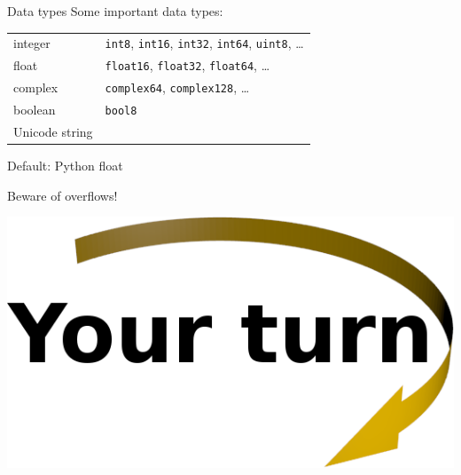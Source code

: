 \documentclass[svgnames]{beamer}
\begin{document}
\begin{frame}{Data types}
Some important data types:

\vspace{0.3truecm}
\begin{tabular}{ll}
integer & \texttt{int8}, \texttt{int16}, \texttt{int32}, \texttt{int64}, \texttt{uint8}, \dots\\[0.2truecm]
float   & \texttt{float16}, \texttt{float32}, \texttt{float64}, \dots \\[0.2truecm]
complex & \texttt{complex64}, \texttt{complex128}, \dots\\[0.2truecm]
boolean & \texttt{bool8}\\[0.2truecm]
Unicode string  & \\
\end{tabular}

\vspace{0.3truecm}
Default: Python float

\vspace{0.3truecm}
\begin{center}
 \alert{Beware of overflows!}
\end{center}

\begin{center}
 \includegraphics[width=3truecm]{yourturn}
\end{center}
\end{frame}
\end{document}
